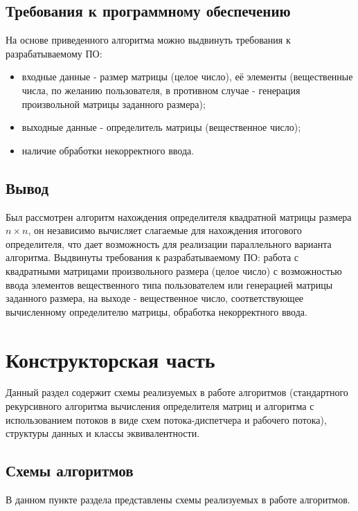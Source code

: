 \documentclass[a4paper,oneside,14pt]{extreport}
\begin{document}
\section{Требования к программному обеспечению}
На основе приведенного алгоритма можно выдвинуть требования к разрабатываемому ПО:
\begin{itemize}
	\item входные данные - размер матрицы (целое число), её элементы (вещественные числа, по желанию пользователя, в противном случае - генерация произвольной матрицы заданного размера);
	\item выходные данные - определитель матрицы (вещественное число);
	\item наличие обработки некорректного ввода.
\end{itemize}

\section{Вывод}
Был рассмотрен алгоритм нахождения определителя квадратной матрицы размера $n \times n$, он независимо вычисляет слагаемые
для нахождения итогового определителя, что дает возможность для реализации параллельного варианта алгоритма. Выдвинуты требования к разрабатываемому ПО: работа с квадратными матрицами произвольного размера (целое число) с возможностью ввода элементов вещественного типа пользователем или генерацией матрицы заданного размера, на выходе - вещественное число, соответствующее вычисленному определителю матрицы, обработка некорректного ввода.
\newpage

\chapter{Конструкторская часть}
Данный раздел содержит схемы реализуемых в работе алгоритмов (стандартного рекурсивного алгоритма вычисления определителя матриц и алгоритма с использованием потоков в виде схем потока-диспетчера и рабочего потока), структуры данных и классы эквивалентности.

\section{Схемы алгоритмов}
В данном пункте раздела представлены схемы реализуемых в работе алгоритмов.
\end{document}
